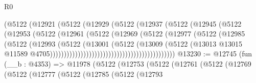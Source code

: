 \begin{lexlean}{R0}
\begin{coremodule}
                                          (@5122
                                            (@12921
                                              (@5122
                                                (@12929
                                                  (@5122
                                                    (@12937
                                                      (@5122
                                                        (@12945
                                                          (@5122
                                                            (@12953
                                                              (@5122
                                                                (@12961
                                                                  (@5122
                                                                    (@12969
                                                                      (@5122
                                                                        (@12977
                                                                          (@5122
                                                                            (@12985
                                                                              (@5122
                                                                                (@12993
                                                                                  (@5122
                                                                                    (@13001
                                                                                      (@5122
                                                                                        (@13009
                                                                                          (@5122
                                                                                            (@13013
                                                                                              @13015
                                                                                              @11589
                                                                                              @4705)))))))))))))))))))))))))))))))))))))))))))))
@13230 := @12745
    (fun (__b : @4353) =>
    @11978
      (@5122
        (@12753
          (@5122
            (@12761
              (@5122
                (@12769
                  (@5122
                    (@12777
                      (@5122
                        (@12785
                          (@5122
                            (@12793

\end{coremodule}
\end{lexlean}
